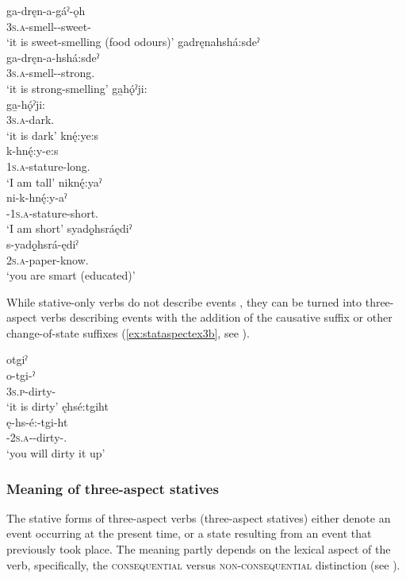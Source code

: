 \gll ga-dręn-a-gáˀ-ǫh\\
 \textsc{3s.a}-smell-{\joinerA}-sweet-{\stative}\\
\glt `it is sweet-smelling (food odours)'
\ex gadręnahshá:sdeˀ\\\label{ex:stataspectex2j}
\gll ga-dręn-a-hshá:sdeˀ\\
 \textsc{3s.a}-smell-{\joinerA}-strong.{\stative}\\
\glt `it is strong-smelling'
\ex ga̱hǫ́ˀji:\\\label{ex:stataspectex2k}
\gll ga̱-hǫ́ˀji:\\
 \textsc{3s.a}-dark.{\stative}\\
\glt `it is dark'
\ex knę́:ye:s\\\label{ex:stataspectex2l}
\gll k-hnę́:y-e:s\\
 \textsc{1s.a}-stature-long.{\stative}\\
\glt `I am tall'
\ex niknę́:yaˀ\\\label{ex:stataspectex2m}
\gll ni-k-hnę́:y-aˀ\\
 {\partitive}-\textsc{1s.a}-stature-short.{\stative}\\
\glt `I am short'
\ex syadǫ̱hsráędiˀ\\\label{ex:stataspectex2n}
\gll s-yadǫ̱hsrá-ędiˀ\\
 \textsc{2s.a}-paper-know.{\stative}\\
\glt `you are smart (educated)'
\z
\z

While stative-only verbs do not describe events , they can be turned into three-aspect verbs describing events with the addition of the causative suffix or other change-of-state suffixes (\ref{ex:stataspectex3b}, see ). 

\ea\label{ex:stataspectex3}
\ea otgiˀ\\\label{ex:stataspectex3a}
\gll o-tgi-ˀ\\
 \textsc{3s.p}-dirty-{\stative}\\
\glt `it is dirty'
\ex ęhsé:tgiht \\\label{ex:stataspectex3b}
\gll ę-hs-é:-tgi-ht\\
{\future}-\textsc{2s.a}-{\joinerE}-dirty-{\causative}.{\zeropunctual}\\
\glt ‘you will dirty it up’ 
\z
\z



\subsubsection{Meaning of three-aspect statives} \label{Meaning of three-aspect statives}
The stative forms of three-aspect verbs (three-aspect statives) either denote an event occurring at the present time, or a state resulting from an event that previously took place. The meaning partly depends on the lexical aspect of the verb, specifically, the \textsc{consequential} versus \textsc{non-consequential} distinction (see ). 

